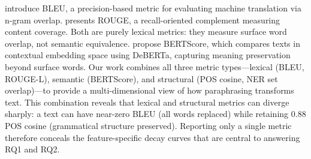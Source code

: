 \citet{papineni2002bleu} introduce BLEU, a precision-based metric for evaluating machine translation via n-gram overlap. \citet{lin2004rouge} presents ROUGE, a recall-oriented complement measuring content coverage. Both are purely lexical metrics: they measure surface word overlap, not semantic equivalence. \citet{zhang2020bertscore} propose BERTScore, which compares texts in contextual embedding space using DeBERTa, capturing meaning preservation beyond surface words. Our work combines all three metric types---lexical (BLEU, ROUGE-L), semantic (BERTScore), and structural (POS cosine, NER set overlap)---to provide a multi-dimensional view of how paraphrasing transforms text. This combination reveals that lexical and structural metrics can diverge sharply: a text can have near-zero BLEU (all words replaced) while retaining 0.88 POS cosine (grammatical structure preserved). Reporting only a single metric therefore conceals the feature-specific decay curves that are central to answering RQ1 and RQ2.

